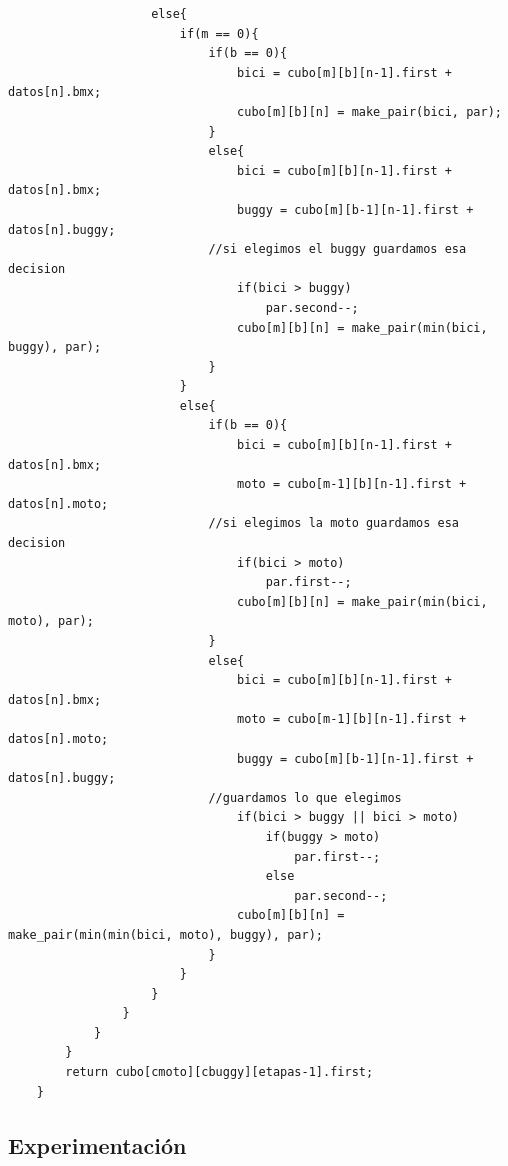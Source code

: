 	\begin{codesnippet}
	\begin{verbatim}
                    else{
                        if(m == 0){
                            if(b == 0){
                                bici = cubo[m][b][n-1].first + datos[n].bmx;
                                cubo[m][b][n] = make_pair(bici, par);
                            }
                            else{
                                bici = cubo[m][b][n-1].first + datos[n].bmx;
                                buggy = cubo[m][b-1][n-1].first + datos[n].buggy;
                            //si elegimos el buggy guardamos esa decision
                                if(bici > buggy)
                                    par.second--;
                                cubo[m][b][n] = make_pair(min(bici, buggy), par);
                            }
                        }
                        else{
                            if(b == 0){
                                bici = cubo[m][b][n-1].first + datos[n].bmx;
                                moto = cubo[m-1][b][n-1].first + datos[n].moto;
                            //si elegimos la moto guardamos esa decision
                                if(bici > moto)
                                    par.first--;
                                cubo[m][b][n] = make_pair(min(bici, moto), par);
                            }
                            else{
                                bici = cubo[m][b][n-1].first + datos[n].bmx;
                                moto = cubo[m-1][b][n-1].first + datos[n].moto;
                                buggy = cubo[m][b-1][n-1].first + datos[n].buggy;
                            //guardamos lo que elegimos
                                if(bici > buggy || bici > moto)
                                    if(buggy > moto)
                                        par.first--;
                                    else
                                        par.second--;
                                cubo[m][b][n] = make_pair(min(min(bici, moto), buggy), par);
                            }
                        }
                    }
                }
            }
        }
        return cubo[cmoto][cbuggy][etapas-1].first;
    }
	\end{verbatim}
	\end{codesnippet}

\newpage
\subsection{Experimentaci\'on}

